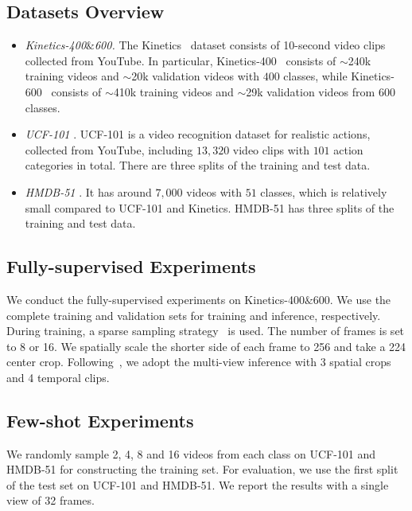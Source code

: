 \documentclass[runningheads]{llncs}
\begin{document}
\subsection{Datasets Overview}\label{sec:dataset_overview}
\begin{itemize}
\item \textit{Kinetics-400$\&$600.} The Kinetics~\cite{k400,k600} dataset consists of 10-second video clips collected from YouTube. In particular, Kinetics-400~\cite{k400} consists of $\sim$240k training videos and $\sim$20k validation videos with $400$ classes, while Kinetics-600~\cite{k600} consists of $\sim$410k training videos and $\sim$29k validation videos from $600$ classes. 

\item \textit{UCF-101} \cite{soomro2012ucf101}. UCF-101 is a video recognition dataset for realistic actions, collected from YouTube, including $13,320$ video clips with $101$ action categories in total. There are three splits of the training and test data.

\item \textit{HMDB-51} \cite{kuehne2011hmdb}. It has around $7,000$ videos with $51$ classes, which is relatively small compared to UCF-101 and Kinetics. HMDB-51 has three splits of the training and test data.
\end{itemize}

\subsection{Fully-supervised Experiments}\label{sec:split_fully}
We conduct the fully-supervised experiments on Kinetics-400$\&$600. We use the complete training and validation sets for training and inference, respectively. During training, a sparse sampling strategy~\cite{wang2016tsn} is used. The number of frames is set to 8 or 16. We spatially scale the shorter side of each frame to 256 and take a 224 center crop.  Following~\cite{liu2021video,arnab2021vivit,timesformer2021}, we adopt the multi-view inference with 3 spatial crops and 4 temporal clips.

\subsection{Few-shot Experiments}\label{sec:split_few}
We randomly sample 2, 4, 8 and 16 videos from each class on UCF-101 and HMDB-51 for constructing the training set. For evaluation, we use the first split of the test set on UCF-101 and HMDB-51. We report the results with a single view of 32 frames.
\end{document}
